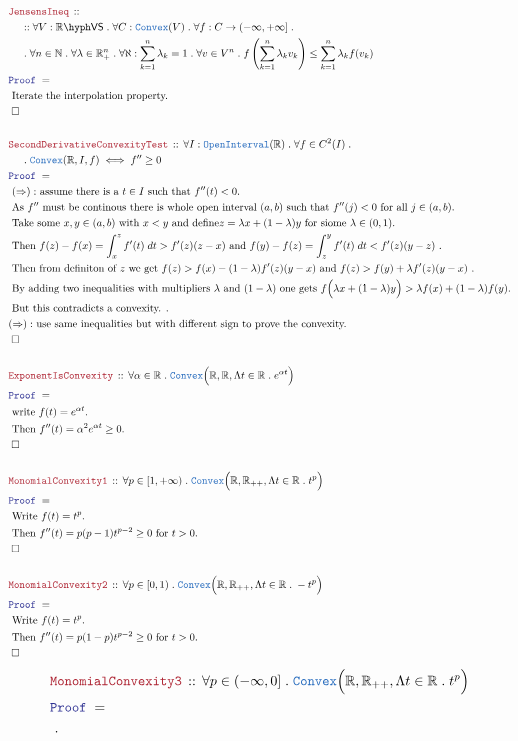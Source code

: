 \documentclass[12pt]{scrartcl}
\newcommand{\TYPE}[1]{\textcolor{NavyBlue}{\mathtt{#1}}}
\newcommand{\LOGIC}[1]{\textcolor{Blue}{\mathtt{#1}}}
\newcommand{\THM}[1]{\textcolor{Maroon}{\mathtt{#1}}}
\renewcommand{\.}{\; . \;}
\newcommand{\Theorem}[2]{& \THM{#1} \, :: \, #2 \\ & \Proof = \\ }
\newcommand{\NewLine}{\\ & \kern 1pc}
\newcommand{\Page}[1]{ \begin{align*} #1 \end{align*}   }
\newcommand{\Reals}{\mathbb{R} }
\newcommand{\Nat}{\mathbb{N} }
\newcommand{\QED}{\; \square}
\newcommand{\EndProof}{& \QED \\}
\newcommand{\Proof}{\LOGIC{Proof} \; }
\newcommand{\Explain}[1]{& \text{#1.} \\}
\newcommand{\VS}[1]{#1\hyph\mathsf{VS}} %
\newcommand{\Convex}{\TYPE{Convex}}
\begin{document}
\Page{
	\Theorem{JensensIneq}
	{
		\NewLine ::		
		\forall V : \VS{\Reals} \.
		\forall C : \Convex(V) \.
		\forall f : C \to (-\infty,+\infty] \. \NewLine \.
		\forall n \in \Nat \.
		\forall \lambda \in \Reals^n_+ \.
		\forall \aleph : \sum^n_{k=1} \lambda_k = 1 \.
		\forall v \in V^n \.
		f\left( \sum^n_{k=1} \lambda_k v_k \right) \le \sum^n_{k=1} \lambda_k f(v_k)
	}
	\Explain{ Iterate the interpolation property}
	\EndProof
	\\
	\Theorem{SecondDerivativeConvexityTest}
	{
		\forall  I : \TYPE{OpenInterval}(\Reals) \.
		\forall f \in C^2(I) \. \NewLine \.
		\Convex(\Reals,I,f)
		\iff
		f'' \ge 0
	}
	\Explain{
		$(\Rightarrow):$ assume there is a $t \in I$ such that $f''(t) < 0$}
	\Explain{
		As $f''$ must be continous there is whole open interval $(a,b)$ 
		such that $f''(j) < 0$ for all $j \in (a,b)$}
	\Explain{
		Take some $x,y \in (a,b)$ with $x < y$ 
		and define$z = \lambda x + (1-\lambda) y$
		for siome $\lambda \in (0,1)$}
	\Explain{
		Then 
		$f(z) - f(x) = \int^z_x f'(t) \; dt  > f'(z)(z - x) $
		and
		$f(y) - f(z) = \int^y_z f'(t) \; dt < f'(z)(y- z)$
	}
	\Explain{
		Then from definiton of $z$ we get
		$f(z) > f(x)   - (1-\lambda) f'(z)(y - x)$
		and
		$f(z) > f(y)  + \lambda f'(z)(y-x) $
	}
	\Explain{
		By adding two inequalities with multipliers $\lambda$ and $(1-\lambda)$ one gets
		$f\Big( \lambda x + (1-\lambda)y\Big) > \lambda f(x) + (1-\lambda) f(y)$}
	\Explain{
		But this contradicts a convexity.
	}
	\Explain{$(\Rightarrow):$ use same inequalities but with different sign to prove the convexity}
	\EndProof
	\\
	\Theorem{ExponentIsConvexity}
	{
		\forall \alpha \in \Reals \. \Convex\Big(\Reals,\Reals,\Lambda t \in \Reals \. e^{\alpha t} \Big) 
	}
	\Explain{
		write $f(t) = e^{\alpha t}$}
	\Explain{
		Then $f''(t) = \alpha^2 e^{\alpha t} \ge 0$}
	\EndProof
	\\
	\Theorem{MonomialConvexity1}
	{
		\forall p \in [1,+\infty) \. \Convex\Big(\Reals,\Reals_{++},\Lambda t \in \Reals \. t^p \Big) 
	}
	\Explain{
		Write $f(t) = t^{p}$}
	\Explain{
		Then $f''(t) =  p(p-1)t^{p-2} \ge 0$ for $t > 0$}
	\EndProof
	\\
	\Theorem{MonomialConvexity2}
	{
		\forall p \in [0,1) \. \Convex\Big(\Reals,\Reals_{++},\Lambda t \in \Reals \. -t^p \Big) 
	}
	\Explain{
		Write $f(t) = t^{p}$}
	\Explain{
		Then $f''(t) =  p(1-p)t^{p-2} \ge 0$ for $t > 0$}
	\EndProof
}\Page{
	\Theorem{MonomialConvexity3}
	{
		\forall p \in (-\infty,0] \. \Convex\Big(\Reals,\Reals_{++},\Lambda t \in \Reals \. t^p \Big) 
	}
	\Explain{
}}
\end{document}
